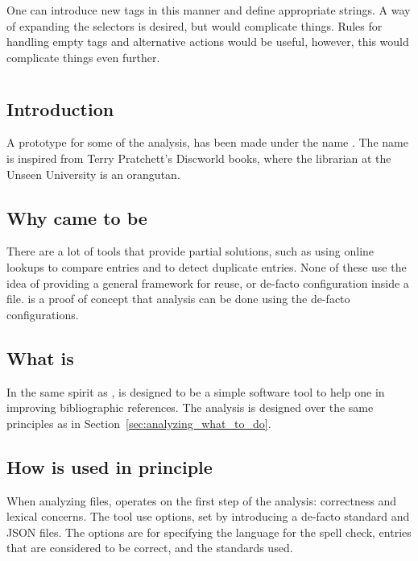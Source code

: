 One can introduce new tags in this manner and define appropriate
strings.  A way of expanding the selectors is desired, but would
complicate things.  Rules for handling empty tags and alternative
actions would be useful, however, this would complicate things even
further.


\section{{\orangutan}}
\label{sec:analyzing_orangutan}
\subsection{Introduction}

A prototype for some of the analysis, has been made under the name
\newdef{\orangutan}.  The name {\orangutan} is inspired from Terry
Pratchett's Discworld books, where the librarian at the Unseen
University is an orangutan.


\subsection{Why {\orangutan} came to be}

There are a lot of tools that provide partial solutions, such as using
online lookups to compare entries and to detect duplicate entries.
None of these use the idea of providing a general framework for reuse,
or de-facto configuration inside a {\bibtex} file.  {\orangutan} is a
proof of concept that analysis can be done using the de-facto
configurations.



\subsection{What is {\orangutan}}

In the same spirit as {\bibtex}, {\orangutan} is designed to be a
simple software tool to help one in improving bibliographic
references.  The analysis is designed over the same principles as in
Section~\ref{sec:analyzing_what_to_do}.


\subsection{How {\orangutan} is used in principle}

When analyzing {\bibtex} files, {\orangutan} operates on the first
step of the analysis: correctness and lexical concerns.  The tool use
options, set by introducing a de-facto standard and JSON files.  The
options are for specifying the language for the spell check, entries
that are considered to be correct, and the standards used.


